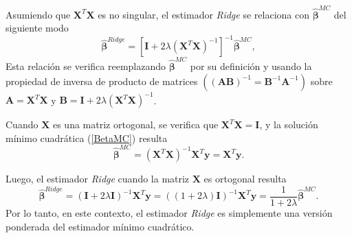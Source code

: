 \documentclass[a4paper,12pt]{report}
\begin{document}
Asumiendo que $\boldsymbol{X}^T\boldsymbol{X}$ es no singular, el estimador \textit{Ridge} se relaciona con $\boldsymbol{\hat{\beta}}^{MC}$ del siguiente modo
\begin{equation}
\boldsymbol{\hat{\beta}}^{Ridge}=[\boldsymbol{I}+2\lambda (\boldsymbol{X}^T\boldsymbol{X})^{-1}]^{-1}\boldsymbol{\hat{\beta}}^{MC},
\end{equation}
Esta relación se verifica reemplazando $\boldsymbol{\hat{\beta}}^{MC}$ por su definición y usando la propiedad de inversa de producto de matrices $\left((\boldsymbol{AB})^{-1}=\boldsymbol{B}^{-1}\boldsymbol{A}^{-1}\right)$ sobre {$\boldsymbol{A}=\boldsymbol{X}^T\boldsymbol{X}$} y $\boldsymbol{B}=\boldsymbol{I}+2\lambda (\boldsymbol{X}^T\boldsymbol{X})^{-1}$.

Cuando $\boldsymbol{X}$ es una matriz ortogonal, se verifica que $\boldsymbol{X}^T\boldsymbol{X}=\boldsymbol{I}$, y la solución mínimo cuadrática (\ref{BetaMC}) resulta
\begin{equation}
\boldsymbol{\hat{\beta}}^{MC}=(\boldsymbol{X}^T\boldsymbol{X})^{-1}\boldsymbol{X}^T\boldsymbol{y}=\boldsymbol{X}^T\boldsymbol{y}.
\end{equation}

Luego, el estimador \textit{Ridge} cuando la matriz $\boldsymbol{X}$ es ortogonal resulta
\begin{equation}
\label{BETA_RIDGE_ORTO}
\boldsymbol{\hat{\beta}}^{Ridge}=(\boldsymbol{I}+2\lambda \boldsymbol{I})^{-1}\boldsymbol{X}^T\boldsymbol{y}=((1+2\lambda )\boldsymbol{I})^{-1}\boldsymbol{X}^T\boldsymbol{y}=\frac{1}{1+2\lambda}\boldsymbol{\hat{\beta}}^{MC}.
\end{equation}
Por lo tanto, en este contexto, el estimador \textit{Ridge} es simplemente una versión ponderada del estimador mínimo cuadrático.
\end{document}
